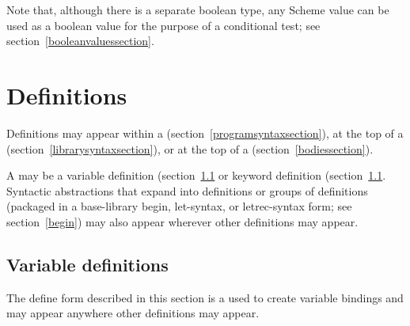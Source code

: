Note that, although there is a separate boolean type, any Scheme value
can be used as a boolean value for the purpose of a conditional test;
see section~\ref{booleanvaluessection}.

\section{Definitions}
\label{defines}

Definitions may appear within a
 (section~\ref{programsyntaxsection}),
at the top of a  (section~\ref{librarysyntaxsection}),
or at the top of a  (section~\ref{bodiessection}).

A  may be a variable definition
(section~\ref{variabledefinitionsection} or
keyword definition
(section~\ref{variabledefinitionsection}.
Syntactic abstractions that expand into definitions or groups of
definitions (packaged in a base-library {\cf begin}, {\cf let-syntax}, or
{\cf letrec-syntax} form; see section~\ref{begin}) may also appear
wherever other definitions may appear.

\subsection{Variable definitions}
\label{variabledefinitionsection}

The {\cf define} form described in this section is a
 used to create variable bindings
and may appear anywhere other definitions may appear.

